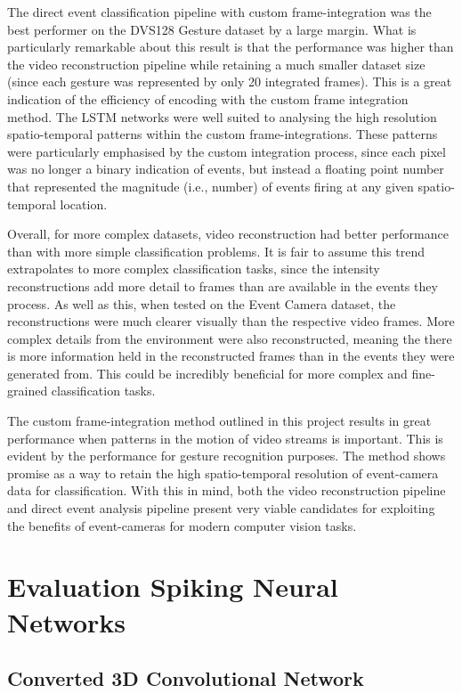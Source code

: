 The direct event classification pipeline with custom frame-integration was the best performer on the DVS128 Gesture dataset by a large margin. What is particularly remarkable about this result is that the performance was higher than the video reconstruction pipeline while retaining a much smaller dataset size (since each gesture was represented by only 20 integrated frames). This is a great indication of the efficiency of encoding with the custom frame integration method. The LSTM networks were well suited to analysing the high resolution spatio-temporal patterns within the custom frame-integrations. These patterns were particularly emphasised by the custom integration process, since each pixel was no longer a binary indication of events, but instead a floating point number that represented the magnitude (i.e., number) of events firing at any given spatio-temporal location. 

Overall, for more complex datasets, video reconstruction had better performance than with more simple classification problems. It is fair to assume this trend extrapolates to more complex classification tasks, since the intensity reconstructions add more detail to frames than are available in the events they process. As well as this, when tested on the Event Camera dataset, the reconstructions were much clearer visually than the respective video frames. More complex details from the environment were also reconstructed, meaning the there is more information held in the reconstructed frames than in the events they were generated from. This could be incredibly beneficial for more complex and fine-grained classification tasks. 

The custom frame-integration method outlined in this project results in great performance when patterns in the motion of video streams is important. This is evident by the performance for gesture recognition purposes. The method shows promise as a way to retain the high spatio-temporal resolution of event-camera data for classification. With this in mind, both the video reconstruction pipeline and direct event analysis pipeline present very viable candidates for exploiting the benefits of event-cameras for modern computer vision tasks.

\section{Evaluation Spiking Neural Networks}

\subsection{Converted 3D Convolutional Network}

